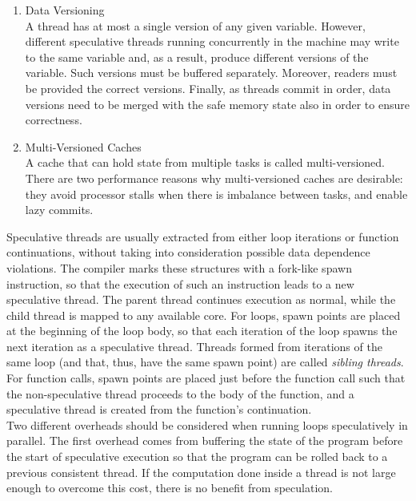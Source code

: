 \documentclass[10pt]{report}          %
\begin{document}
\begin{enumerate}
\item Data Versioning \\

A thread has at most a single version of any given variable. However, different speculative threads running concurrently in the machine may write to the same variable and, as a result, produce different versions of the variable. Such versions must be buffered separately. Moreover, readers must be provided the correct versions. Finally, as threads commit in order, data versions need to be merged with the safe memory state also in order to ensure correctness.

\item Multi-Versioned Caches \\

 A cache that can hold state from multiple tasks is called multi-versioned. \cite{Cintra00}\\
\cite{Gopal}\cite{steffanISCA00} There are two performance reasons why multi-versioned caches are desirable: they avoid processor stalls when there is imbalance between tasks, and enable lazy commits. 
 
 \end{enumerate}
 
 Speculative threads are usually extracted from either loop iterations or function continuations, without taking into consideration possible data dependence violations. The compiler marks these
structures with a fork-like spawn instruction, so that the execution
of such an instruction leads to a new speculative thread. The parent thread continues execution as normal, while the child thread is mapped to any available core. For loops, spawn points are placed
at the beginning of the loop body, so that each iteration of the loop spawns the next iteration as a speculative thread. Threads formed from iterations of the same loop (and that, thus, have the
same spawn point) are called \textit{sibling threads}. For function calls, spawn points are placed just before the function call such that the non-speculative thread proceeds to the body of the function, and a speculative thread is created from the function’s continuation. \cite{XekalakisICS09} \\

Two different overheads should be considered when running loops speculatively in parallel.  The first overhead comes from buffering the state of the program before the start of speculative execution so that the program can be rolled back to a previous consistent thread.  If the computation done inside a thread is not large enough to overcome this cost, there is no benefit from speculation. \\
\end{document}
